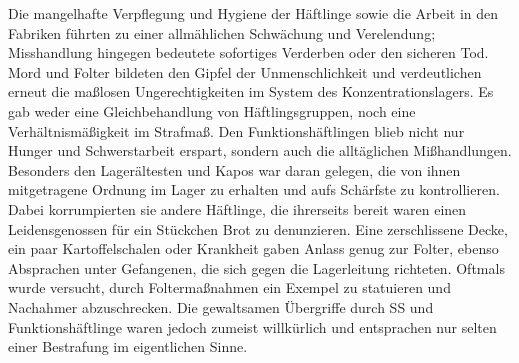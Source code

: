 \documentclass[a4paper,12pt,ngerman,
]{nisebook}
\begin{document}
Die mangelhafte Verpflegung und Hygiene der Häftlinge sowie die Arbeit in den Fabriken führten zu einer allmählichen Schwächung und Verelendung; Misshandlung hingegen bedeutete sofortiges Verderben oder den sicheren Tod. \newline
Mord und Folter bildeten den Gipfel der Unmenschlichkeit und verdeutlichen erneut die maßlosen Ungerechtigkeiten im System des Konzentrationslagers. Es gab weder eine Gleichbehandlung von Häftlingsgruppen, noch eine Verhältnismäßigkeit im Strafmaß. Den Funktionshäftlingen blieb nicht nur Hunger und Schwerstarbeit erspart, sondern auch die alltäglichen Mißhandlungen. Besonders den Lagerältesten und Kapos war daran gelegen, die von ihnen mitgetragene Ordnung im Lager zu erhalten und aufs Schärfste zu kontrollieren. Dabei korrumpierten sie andere Häftlinge, die ihrerseits bereit waren einen Leidensgenossen für ein Stückchen Brot zu denunzieren. Eine zerschlissene Decke, ein paar Kartoffelschalen oder Krankheit gaben Anlass genug zur Folter, ebenso Absprachen unter Gefangenen, die sich gegen die Lagerleitung richteten. Oftmals wurde versucht, durch Foltermaßnahmen ein Exempel zu statuieren und Nachahmer abzuschrecken. Die gewaltsamen Übergriffe durch SS und Funktionshäftlinge waren jedoch zumeist willkürlich und entsprachen nur selten einer Bestrafung im eigentlichen Sinne.
 \newline
\end{document}

